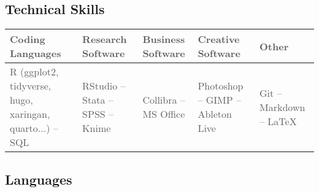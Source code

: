 \documentclass[11pt,a4paper,]{awesome-cv}
\begin{document}
\hypertarget{technical-skills}{%
\subsection{Technical Skills}\label{technical-skills}}

\begin{table}[H]
\centering\begingroup\fontsize{9}{11}\selectfont

\begin{tabular}{>{\centering\arraybackslash}p{2.96cm}>{\centering\arraybackslash}p{2.96cm}>{\centering\arraybackslash}p{2.96cm}>{\centering\arraybackslash}p{2.96cm}>{\centering\arraybackslash}p{2.96cm}}
\toprule
\textcolor[HTML]{5d5d5d}{\textbf{Coding Languages}} & \textcolor[HTML]{5d5d5d}{\textbf{Research Software}} & \textcolor[HTML]{5d5d5d}{\textbf{Business Software}} & \textcolor[HTML]{5d5d5d}{\textbf{Creative Software}} & \textcolor[HTML]{5d5d5d}{\textbf{Other}}\\
\midrule
\textcolor[HTML]{5d5d5d}{R (ggplot2, tidyverse, hugo, xaringan, quarto...) -- SQL} & \textcolor[HTML]{5d5d5d}{RStudio -- Stata -- SPSS -- Knime} & \textcolor[HTML]{5d5d5d}{Collibra -- MS Office} & \textcolor[HTML]{5d5d5d}{Photoshop -- GIMP -- Ableton Live} & \textcolor[HTML]{5d5d5d}{Git -- Markdown -- LaTeX}\\
\bottomrule
\end{tabular}
\endgroup{}
\end{table}

\hypertarget{languages}{%
\subsection{Languages}\label{languages}}
\end{document}
